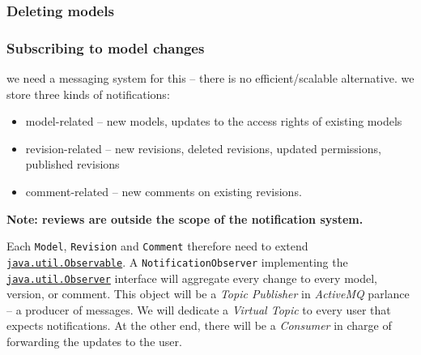 \subsubsection{Deleting models}

\subsubsection{Subscribing to model changes}

\begin{techNote}
we need a messaging system for this -- there is no efficient/scalable alternative. we store three kinds of notifications: 
\begin{itemize}
\item model-related -- new models, updates to the access rights of existing models
\item revision-related -- new revisions, deleted revisions, updated permissions, published revisions
\item comment-related -- new comments on existing revisions.
\end{itemize}
\textbf{Note: reviews are outside the scope of the notification system.}

Each \texttt{Model}, \texttt{Revision} and \texttt{Comment} therefore need to extend \href{http://docs.oracle.com/javase/6/docs/api/java/util/Observable.html}{\texttt{java.util.Observable}}. A \texttt{NotificationObserver} implementing the \href{http://docs.oracle.com/javase/6/docs/api/java/util/Observer.html}{\texttt{java.util.Observer}} interface will aggregate every change to every model, version, or comment. This object will be a \emph{Topic Publisher} in \emph{ActiveMQ} parlance -- a producer of messages. We will dedicate a \emph{Virtual Topic} to every user that expects notifications. At the other end, there will be a \emph{Consumer} in charge of forwarding the updates to the user. 
\end{techNote}


